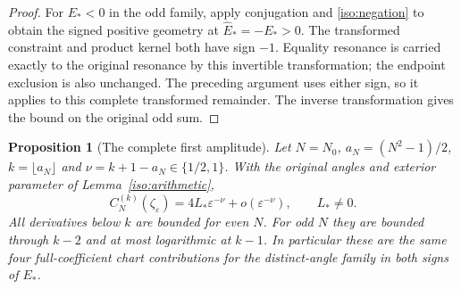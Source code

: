\documentclass[11pt]{article}
\numberwithin{equation}{section}
\newtheorem{proposition}[theorem]{Proposition}
\theoremstyle{definition}
\newcommand{\eps}{\varepsilon}
\begin{document}
\begin{proof}
For $E_*<0$ in the odd family, apply conjugation and
\eqref{iso:negation} to obtain the signed positive geometry at
$\widehat E_*=-E_*>0$. The transformed constraint and product
kernel both have sign $-1$. Equality resonance is carried exactly
to the original resonance by this invertible transformation; the
endpoint exclusion is also unchanged. The preceding argument uses
either sign, so it applies to this complete transformed remainder.
The inverse transformation gives the bound on the original odd sum.
\end{proof}

\begin{proposition}[The complete first amplitude]\label{iso:first}
Let $N=N_0$, $a_N=(N^2-1)/2$, $k=\lfloor a_N\rfloor$ and
$\nu=k+1-a_N\in\{1/2,1\}$. With the original angles and exterior
parameter of Lemma~\ref{iso:arithmetic},
\[
 C_N^{(k)}(\zeta_\eps)
       =4L_*\eps^{-\nu}+o(\eps^{-\nu}),\qquad L_*\ne0.
\]
All derivatives below $k$ are bounded for even $N$. For odd $N$
they are bounded through $k-2$ and at most logarithmic at $k-1$.
In particular these are the same four full-coefficient chart
contributions for the distinct-angle family in both signs of $E_*$.
\end{proposition}
\end{document}
